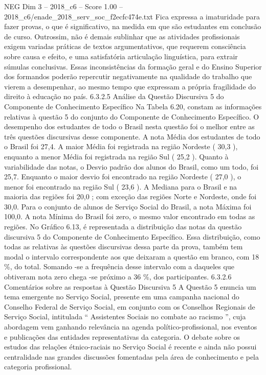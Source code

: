 \begin{textsample}{NEG Dim 3 – 2018\_c6 – Score 1.00 – 2018\_c6/enade\_2018\_serv\_soc\_f2ecfc474e.txt}
Fica expressa a imaturidade para fazer provas, o que é significativo, na medida em que são estudantes em conclusão de curso.
Outrossim, não é demais sublinhar que as atividades profissionais exigem variadas práticas de textos argumentativos, que requerem consciência sobre causa e efeito, e uma satisfatória articulação linguística, para extrair súmulas conclusivas.
Essas inconsistências da formação geral e do Ensino Superior dos formandos poderão repercutir negativamente na qualidade do trabalho que vierem a desempenhar, ao mesmo tempo que expressam a própria fragilidade do direito à educação no país. 6.3.2.5 Análise da Questão Discursiva 5 do Componente de Conhecimento Específico Na Tabela 6.20, constam as informações relativas à questão 5 do conjunto do Componente de Conhecimento Específico.
O desempenho dos estudantes de todo o Brasil nesta questão foi o melhor entre as três questões discursivas desse componente.
A nota Média dos estudantes de todo o Brasil foi 27,4.
A maior Média foi registrada na região Nordeste ( 30,3 ), enquanto a menor Média foi registrada na região Sul ( 25,2 ).
Quanto à variabilidade das notas, o Desvio padrão dos alunos do Brasil, como um todo, foi 25,7.
Enquanto o maior desvio foi encontrado na região Nordeste ( 27,0 ), o menor foi encontrado na região Sul ( 23,6 ).
A Mediana para o Brasil e na maioria das regiões foi 20,0 ; com exceção das regiões Norte e Nordeste, onde foi 30,0.
Para o conjunto de alunos de Serviço Social do Brasil, a nota Máxima foi 100,0.
A nota Mínima do Brasil foi zero, o mesmo valor encontrado em todas as regiões.
No Gráfico 6.13, é representada a distribuição das notas da questão discursiva 5 do Componente de Conhecimento Específico.
Essa distribuição, como todas as relativas às questões discursivas dessa parte da prova, também tem modal o intervalo correspondente aos que deixaram a questão em branco, com 18 \%, do total.
Somando -se a frequência desse intervalo com a daqueles que obtiveram nota zero chega -se próximo a 36 \%, dos participantes. 6.3.2.6 Comentários sobre as respostas à Questão Discursiva 5 A Questão 5 enuncia um tema emergente no Serviço Social, presente em uma campanha nacional do Conselho Federal de Serviço Social, em conjunto com os Conselhos Regionais de Serviço Social, intitulada “ Assistentes Sociais no combate ao racismo ”, cuja abordagem vem ganhando relevância na agenda político-profissional, nos eventos e publicações das entidades representativas da categoria.
O debate sobre os estudos das relações étnico-raciais no Serviço Social é recente e ainda não possui centralidade nas grandes discussões fomentadas pela área de conhecimento e pela categoria profissional.

\end{textsample}
